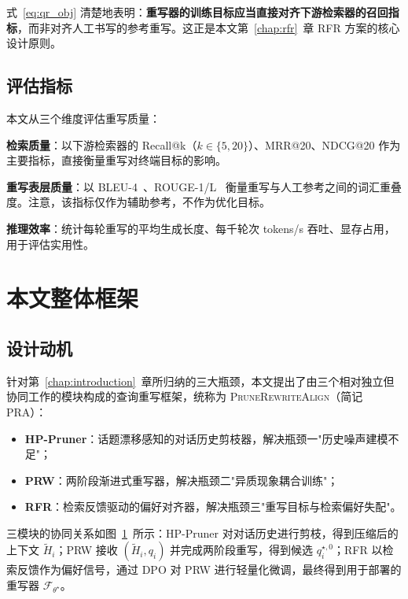 式~\eqref{eq:qr_obj} 清楚地表明：\textbf{重写器的训练目标应当直接对齐下游检索器的召回指标}，而非对齐人工书写的参考重写。这正是本文第~\ref{chap:rfr}~章 RFR 方案的核心设计原则。

\subsection{评估指标}
\label{sec:metric}

本文从三个维度评估重写质量：

\textbf{检索质量}：以下游检索器的 Recall@k（$k\in\{5,20\}$）、MRR@20、NDCG@20 作为主要指标，直接衡量重写对终端目标的影响。

\textbf{重写表层质量}：以 BLEU-4~\citep{papineni2002bleu}、ROUGE-1/L~\citep{lin2004rouge} 衡量重写与人工参考之间的词汇重叠度。注意，该指标仅作为辅助参考，不作为优化目标。

\textbf{推理效率}：统计每轮重写的平均生成长度、每千轮次 tokens/s 吞吐、显存占用，用于评估实用性。

\section{本文整体框架}
\label{sec:framework}

\subsection{设计动机}

针对第~\ref{chap:introduction}~章所归纳的三大瓶颈，本文提出了由三个相对独立但协同工作的模块构成的查询重写框架，统称为 \textsc{PruneRewriteAlign}（简记 PRA）：

\begin{itemize}
    \item \textbf{HP-Pruner}：话题漂移感知的对话历史剪枝器，解决瓶颈一"历史噪声建模不足"；
    \item \textbf{PRW}：两阶段渐进式重写器，解决瓶颈二"异质现象耦合训练"；
    \item \textbf{RFR}：检索反馈驱动的偏好对齐器，解决瓶颈三"重写目标与检索偏好失配"。
\end{itemize}

三模块的协同关系如图~\ref{fig:framework_overall}~所示：HP-Pruner 对对话历史进行剪枝，得到压缩后的上下文 $\tilde H_i$；PRW 接收 $(\tilde H_i, q_i)$ 并完成两阶段重写，得到候选 $q_i^{\star,0}$；RFR 以检索反馈作为偏好信号，通过 DPO 对 PRW 进行轻量化微调，最终得到用于部署的重写器 $\mathcal{F}_{\theta^\star}$。

\begin{figure}[t]
\centering
\label{fig:framework_overall}
\end{figure}

